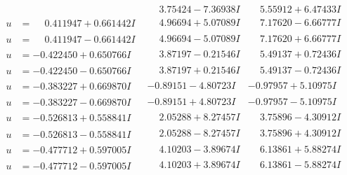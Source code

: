 \documentclass[1p]{elsarticle_modified}
\theoremstyle{definition}
\begin{document}
$$\begin{array}{c|c|c}
 & \phantom{-}3.75424 - 7.36938 I & \phantom{-}5.55912 + 6.47433 I \\ \hline\begin{aligned}
u &= \phantom{-}0.411947 + 0.661442 I\end{aligned}
 & \phantom{-}4.96694 + 5.07089 I & \phantom{-}7.17620 - 6.66777 I \\ \hline\begin{aligned}
u &= \phantom{-}0.411947 - 0.661442 I\end{aligned}
 & \phantom{-}4.96694 - 5.07089 I & \phantom{-}7.17620 + 6.66777 I \\ \hline\begin{aligned}
u &= -0.422450 + 0.650766 I\end{aligned}
 & \phantom{-}3.87197 - 0.21546 I & \phantom{-}5.49137 + 0.72436 I \\ \hline\begin{aligned}
u &= -0.422450 - 0.650766 I\end{aligned}
 & \phantom{-}3.87197 + 0.21546 I & \phantom{-}5.49137 - 0.72436 I \\ \hline\begin{aligned}
u &= -0.383227 + 0.669870 I\end{aligned}
 & -0.89151 - 4.80723 I & -0.97957 + 5.10975 I \\ \hline\begin{aligned}
u &= -0.383227 - 0.669870 I\end{aligned}
 & -0.89151 + 4.80723 I & -0.97957 - 5.10975 I \\ \hline\begin{aligned}
u &= -0.526813 + 0.558841 I\end{aligned}
 & \phantom{-}2.05288 + 8.27457 I & \phantom{-}3.75896 - 4.30912 I \\ \hline\begin{aligned}
u &= -0.526813 - 0.558841 I\end{aligned}
 & \phantom{-}2.05288 - 8.27457 I & \phantom{-}3.75896 + 4.30912 I \\ \hline\begin{aligned}
u &= -0.477712 + 0.597005 I\end{aligned}
 & \phantom{-}4.10203 - 3.89674 I & \phantom{-}6.13861 + 5.88274 I \\ \hline\begin{aligned}
u &= -0.477712 - 0.597005 I\end{aligned}
 & \phantom{-}4.10203 + 3.89674 I & \phantom{-}6.13861 - 5.88274 I \\ \hline\begin{aligned}

\end{aligned}
\end{array}$$
\end{document}
